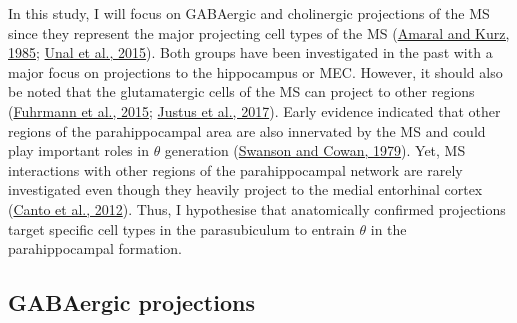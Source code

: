 \documentclass[
  12pt,
  a4paper,
  openany]{book}
\begin{document}
In this study, I will focus on GABAergic and cholinergic projections of the MS since they represent the major projecting cell types of the MS (\protect\hyperlink{ref-amaral_analysis_1985}{Amaral and Kurz, 1985}; \protect\hyperlink{ref-unal_synaptic_2015}{Unal et al., 2015}). Both groups have been investigated in the past with a major focus on projections to the hippocampus or MEC. However, it should also be noted that the glutamatergic cells of the MS can project to other regions (\protect\hyperlink{ref-fuhrmann_locomotion_2015}{Fuhrmann et al., 2015}; \protect\hyperlink{ref-justus_glutamatergic_2017}{Justus et al., 2017}). Early evidence indicated that other regions of the parahippocampal area are also innervated by the MS and could play important roles in \(\theta\) generation (\protect\hyperlink{ref-swanson_connections_1979}{Swanson and Cowan, 1979}). Yet, MS interactions with other regions of the parahippocampal network are rarely investigated even though they heavily project to the medial entorhinal cortex (\protect\hyperlink{ref-canto_all_2012}{Canto et al., 2012}). Thus, I hypothesise that anatomically confirmed projections target specific cell types in the parasubiculum to entrain \(\theta\) in the parahippocampal formation.

\hypertarget{gabaergic-projections}{%
\subsection{GABAergic projections}\label{gabaergic-projections}}
\end{document}
